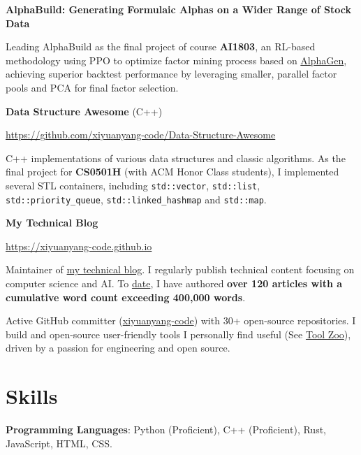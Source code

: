\documentclass[letterpaper,11pt]{article}
\begin{document}
\textbf{AlphaBuild: Generating Formulaic Alphas on a Wider Range of Stock Data}

Leading AlphaBuild as the final project of course \textbf{AI1803}, an RL-based methodology using PPO to optimize factor mining process based on \href{https://github.com/RL-MLDM/alphagen}{AlphaGen}, achieving superior backtest performance by leveraging smaller, parallel factor pools and PCA for final factor selection.
\newline



\textbf{Data Structure Awesome} (C++)

\url{https://github.com/xiyuanyang-code/Data-Structure-Awesome}

C++ implementations of various data structures and classic algorithms. As the final project for \textbf{CS0501H} (with ACM Honor Class students), I implemented several STL containers, including \texttt{std::vector}, \texttt{std::list}, \texttt{std::priority\_queue}, \texttt{std::linked\_hashmap} and \texttt{std::map}.
\newline





\textbf{My Technical Blog}

\url{https://xiyuanyang-code.github.io}

Maintainer of \href{https://xiyuanyang-code.github.io}{my technical blog}. I regularly publish technical content focusing on computer science and AI. To \href{https://xiyuanyang-code.github.io/Blog-word-counting/}{date}, I have authored \textbf{over 120 articles with a cumulative word count exceeding 400,000 words}.

Active GitHub committer (\href{https://github.com/xiyuanyang-code}{xiyuanyang-code}) with 30+ open-source repositories. I build and open-source user-friendly tools I personally find useful (See \href{https://xiyuanyang-code.github.io/Tool-Zoo/}{Tool Zoo}), driven by a passion for engineering and open source.

\section{Skills}
\textbf{Programming Languages}: Python (Proficient), C++ (Proficient), Rust, JavaScript, HTML, CSS.
\end{document}
